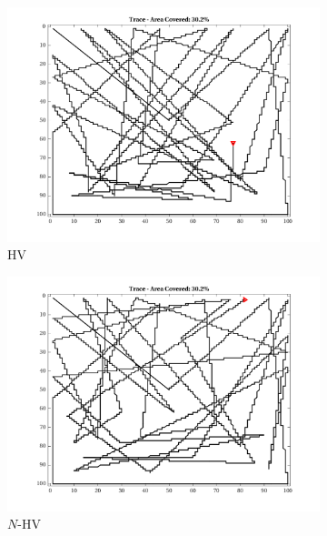 \begin{figure}[htb!]
    \begin{subfigure}[t]{0.25\textwidth}
        \centering
        \includegraphics[width=\linewidth]{figures/path_nhv_30p_100x100_sf_25_seed_1.png}
        \captionsetup{skip=0.20\baselineskip,size=footnotesize}
        \caption{HV}
    \end{subfigure}%
    \begin{subfigure}[t]{0.25\textwidth}
        \centering
        \includegraphics[width=\linewidth]{figures/path_nnhv_30p_100x100_sf_25_seed_1.png}
        \captionsetup{skip=0.20\baselineskip,size=footnotesize}
        \caption{$N$-HV}
    \end{subfigure}%
    \\
    \begin{subfigure}[t]{0.25\textwidth}

\end{subfigure}
\end{figure}
